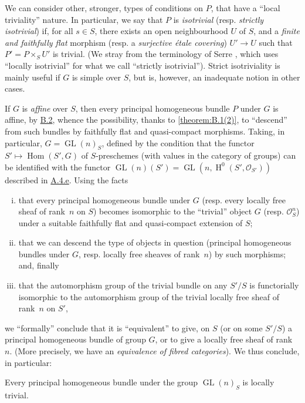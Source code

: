 \documentclass{article}
\theoremstyle{plain}
\newenvironment{proposition}[1]
  {\renewcommand\theinnercustomproposition{#1}\innercustomproposition}
  {\endinnercustomproposition}
\theoremstyle{definition}
\newcommand{\sh}[1]{{\mathscr{#1}}}
\DeclareMathOperator{\Hom}{Hom}
\DeclareMathOperator{\HH}{H}
\DeclareMathOperator{\GL}{GL}
\newcommand{\oldpage}[1]{\marginpar{\footnotesize$\Big\vert$ \textit{p.~#1}}}
\begin{document}
We can consider other, stronger, types of conditions on $P$, that have a ``local triviality'' nature.
In particular, we say that $P$ is \emph{isotrivial} (resp. \emph{strictly isotrivial}) if, for all $s\in S$, there exists an open neighbourhood $U$ of $S$, and a \emph{finite and faithfully flat} morphism (resp. a \emph{surjective \'{e}tale covering}) $U'\to U$ such that $P'=P\times_S U'$ is trivial.
(We stray from the terminology of Serre \cite{1}, which uses ``locally isotrivial'' for what we call ``strictly isotrivial'').
Strict isotriviality is mainly useful if $G$ is simple over $S$, but is, however, an inadequate notion in other cases.

If $G$ is \emph{affine} over $S$, then every principal homogeneous bundle $P$ under $G$ is affine, by \hyperref[B.2]{B.2}, whence the possibility, thanks to \cref{theorem:B.1(2)}, to ``descend''
\oldpage{190-28}
from such bundles by faithfully flat and quasi-compact morphisms.
Taking, in particular, $G=\GL(n)_S$, defined by the condition that the functor $S'\mapsto\Hom(S',G)$ of $S$-preschemes (with values in the category of groups) can be identified with the functor $\GL(n)(S')=\GL(n,\HH^0(S',\sh{O}_{S'}))$ described in \hyperref[A.4.e]{A.4.e}.
Using the facts
\begin{enumerate}[(i)]
  \item that every principal homogeneous bundle under $G$ (resp. every locally free sheaf of rank~$n$ on $S$) becomes isomorphic to the ``trivial'' object $G$ (resp. $\sh{O}_S^n$) under a suitable faithfully flat and quasi-compact extension of $S$;
  \item that we can descend the type of objects in question (principal homogeneous bundles under $G$, resp. locally free sheaves of rank~$n$) by such morphisms; and, finally
  \item that the automorphism group of the trivial bundle on any $S'/S$ is functorially isomorphic to the automorphism group of the trivial locally free sheaf of rank~$n$ on $S'$,
\end{enumerate}
we ``formally'' conclude that it is ``equivalent'' to give, on $S$ (or on some $S'/S$) a principal homogeneous bundle of group $G$, or to give a locally free sheaf of rank~$n$.
(More precisely, we have an \emph{equivalence of fibred categories}).
We thus conclude, in particular:

\begin{proposition}{6.1}
  Every principal homogeneous bundle under the group $\GL(n)_S$ is locally trivial.
\end{proposition}
\end{document}
